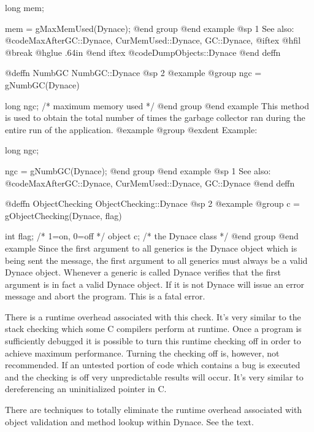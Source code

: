 long    mem;

mem = gMaxMemUsed(Dynace);
@end group
@end example
@sp 1
See also:  @code{MaxAfterGC::Dynace, CurMemUsed::Dynace, GC::Dynace,}
@iftex
@hfil @break @hglue .64in    
@end iftex
@code{DumpObjects::Dynace}
@end deffn









@deffn {NumbGC} NumbGC::Dynace
@sp 2
@example
@group
ngc = gNumbGC(Dynace)

long    ngc;    /*  maximum memory used  */
@end group
@end example
This method is used to obtain the total number of times the garbage
collector ran during the entire run of the application.
@example
@group
@exdent Example:

long    ngc;

ngc = gNumbGC(Dynace);
@end group
@end example
@sp 1
See also:  @code{MaxAfterGC::Dynace, CurMemUsed::Dynace, GC::Dynace}
@end deffn










@deffn {ObjectChecking} ObjectChecking::Dynace
@sp 2
@example
@group
c = gObjectChecking(Dynace, flag)

int     flag;   /*  1=on,  0=off   */
object  c;      /*  the Dynace class  */
@end group
@end example
Since the first argument to all generics is the Dynace object which is
being sent the message, the first argument to all generics must always
be a valid Dynace object.  Whenever a generic is called Dynace verifies that
the first argument is in fact a valid Dynace object.  If it is not Dynace
will issue an error message and abort the program.  This is a fatal
error.

There is a runtime overhead associated with this check.  It's very
similar to the stack checking which some C compilers perform at
runtime.  Once a program is sufficiently debugged it is possible
to turn this runtime checking off in order to achieve maximum
performance.  Turning the checking off is, however, not recommended.
If an untested portion of code which contains a bug is executed
and the checking is off very unpredictable results will occur.
It's very similar to dereferencing an uninitialized pointer in C.

There are techniques to totally eliminate the runtime overhead
associated with object validation and method lookup within Dynace.
See the text.

